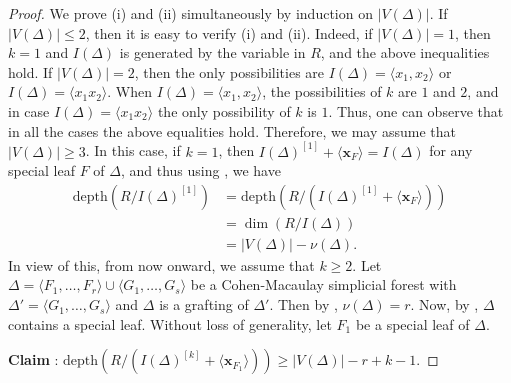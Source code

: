 \documentclass[12pt,a4paper,reqno]{amsart}
\theoremstyle{definition}
\def\D{\Delta}
\def\d{\mathrm{depth}}
\def\l{\langle}
\def\r{\rangle}
\def\x{\mathbf x}
\begin{document}
\begin{proof}
    We prove (i) and (ii) simultaneously by induction on $|V(\Delta)|$. If $|V(\Delta)|\le 2$, then it is easy to verify (i) and (ii). Indeed, if $|V(\D)|=1$, then $k=1$ and $I(\D)$ is generated by the variable in $R$, and the above inequalities hold. If $|V(\D)|=2$, then the only possibilities are $I(\D)=\l x_1,x_2\r$ or $I(\D)=\l x_1x_2\r$. When $I(\D)=\l x_1,x_2\r$, the possibilities of $k$ are $1$ and $2$, and in case $I(\D)=\l x_1x_2\r$ the only possibility of $k$ is $1$. Thus, one can observe that in all the cases the above equalities hold. Therefore, we may assume that $|V(\Delta)|\ge 3$.
    In this case, if $k=1$, then $I(\Delta)^{[1]}+\l\x_F\r=I(\Delta)$ for any special leaf $F$ of $\Delta$, and thus using , we have 
    \begin{align*}
    \d(R/I(\Delta)^{[1]})&=\d(R/(I(\Delta)^{[1]}+\l\x_F\r))\\
    &=\dim(R/I(\Delta))\\
    &=|V(\Delta)|-\nu(\D).    
    \end{align*}
     In view of this, from now onward, we assume that $k\ge 2$. Let $\Delta=\l F_1,\ldots,F_r\r\cup\l G_1,\ldots,G_s\r$ be a Cohen-Macaulay simplicial forest with $\Delta'=\l  G_1,\ldots,G_s\r$ and $\Delta$ is a grafting of $\Delta'$. Then by , $\nu(\D)=r$. Now, by , $\Delta$ contains a special leaf. Without loss of generality, let $F_1$ be a special leaf of $\Delta$.

     \noindent
\textbf{Claim }: $\d(R/(I(\Delta)^{[k]}+\l\x_{F_1}\r))\ge |V(\Delta)|-r+k-1$.


\end{proof}
\end{document}
